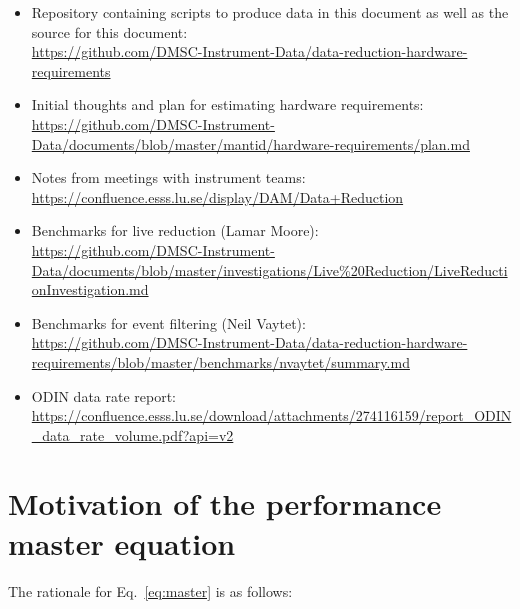 \documentclass[a4paper,english,numbers=noenddot,bibliography=totoc,chapterprefix=on,DIV=12]{scrartcl}
\newcommand{\odin}{ODIN\xspace}
\begin{document}
\begin{itemize}
  \item Repository containing scripts to produce data in this document as well as the source for this document:\\
    \url{https://github.com/DMSC-Instrument-Data/data-reduction-hardware-requirements}
  \item Initial thoughts and plan for estimating hardware requirements:\\
    \url{https://github.com/DMSC-Instrument-Data/documents/blob/master/mantid/hardware-requirements/plan.md}
  \item Notes from meetings with instrument teams:\\
    \url{https://confluence.esss.lu.se/display/DAM/Data+Reduction}
  \item Benchmarks for live reduction (Lamar Moore):\\
    \url{https://github.com/DMSC-Instrument-Data/documents/blob/master/investigations/Live%20Reduction/LiveReductionInvestigation.md}
  \item Benchmarks for event filtering (Neil Vaytet):\\
    \url{https://github.com/DMSC-Instrument-Data/data-reduction-hardware-requirements/blob/master/benchmarks/nvaytet/summary.md}
  \item \odin data rate report:\\
    \url{https://confluence.esss.lu.se/download/attachments/274116159/report_ODIN_data_rate_volume.pdf?api=v2}
\end{itemize}




\section{Motivation of the performance master equation}
\label{app:master_eq}

The rationale for Eq.~\eqref{eq:master} is as follows:
\end{document}
